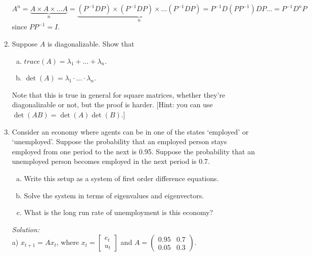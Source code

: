 \documentclass[12pt]{article}
\newif\ifsln
\begin{document}
\begin{enumerate}[1.]
$A^{n} = \underbrace{A\times A \times \dots A}_{n} = \underbrace{(P^{-1}DP)\times (P^{-1}DP)\times \dots (P^{-1}DP)}_{n}  = P^{-1}D(PP^{-1})DP\dots = P^{-1}D^{n}P$ since $PP^{-1} = I$.
\fi


\item Suppose $A$ is diagonalizable. Show that 
	\begin{enumerate}[a)]
		\item $trace(A) = \lambda_{1} + \dots + \lambda_{n}$.
		\item $\det(A) = \lambda_{1}\cdot \dots \cdot \lambda_{n}$.
	\end{enumerate}
Note that this is true in general for square matrices, whether they're diagonalizable or not, but the proof is harder. [Hint: you can use $\det(AB) = \det(A)\det(B)$.]

\ifsln
\textit{Solution:}\\
a) $trace(A) = trace(P^{-1}DP) = trace(P P^{-1}D)$ (by cyclic property) $ = trace(ID) = trace(D) = \sum_{i} \lambda_{i}$\\

b) $\det(A) = \det(P^{-1}DP) = \det(P^{-1}) \det(D) \det(P) = \det(D)$ (since $\det(P^{-1}) = 1 / \det(P)$) $ = \Pi_{i} \lambda_{i}$ (since diagonal matrices are lower triangular).
\fi


\item Consider an economy where agents can be in one of the states `employed' or `unemployed'. Suppose the probability that an employed person stays employed from one period to the next is 0.95. Suppose the probability that an unemployed person becomes employed in the next period is 0.7. 
\begin{enumerate}[a)]
	\item Write this setup as a system of first order difference equations.
	\item Solve the system in terms of eigenvalues and eigenvectors.
	\item What is the long run rate of unemployment is this economy?
\end{enumerate}

\ifsln
\textit{Solution:}\\
a) $x_{t+1} = A x_{t}$, where $x_{t} = \begin{bmatrix}e_{t}\\u_{t}\end{bmatrix}$ and $A = \begin{pmatrix}0.95 & 0.7\\ 0.05 & 0.3 \end{pmatrix}$.\\


\end{enumerate}
\end{document}
